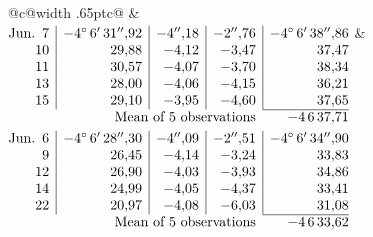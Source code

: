 \noindent\begin{tabular}{@{}c@{\hspace{.4em}\vrule width .65pt\hspace{.4em}}c@{}}
 &
 \\[.18ex]
\(\begin{array}[t]{@{}r|r|r|r|r@{}}
\text{Jun.}\enspace 7 & -4^\circ\,6'\,31''{,}92 & -4''{,}18 & -2''{,}76 & -4^\circ\,6'\,38''{,}86\\
10 & 29{,}88 & -4{,}12 & -3{,}47 & 37{,}47\\
11 & 30{,}57 & -4{,}07 & -3{,}70 & 38{,}34\\
13 & 28{,}00 & -4{,}06 & -4{,}15 & 36{,}21\\
15 & 29{,}10 & -3{,}95 & -4{,}60 & 37{,}65\\
\cline{5-5}
\multicolumn{4}{r}{\text{Mean of 5 observations}} & -4\,6\,37{,}71
\end{array}\)
&
\(\begin{array}[t]{@{}r|r|r|r|r@{}}
\text{Jun.}\enspace 6 & -4^\circ\,6'\,28''{,}30 & -4''{,}09 & -2''{,}51 & -4^\circ\,6'\,34''{,}90\\
9 & 26{,}45 & -4{,}14 & -3{,}24 & 33{,}83\\
12 & 26{,}90 & -4{,}03 & -3{,}93 & 34{,}86\\
14 & 24{,}99 & -4{,}05 & -4{,}37 & 33{,}41\\
22 & 20{,}97 & -4{,}08 & -6{,}03 & 31{,}08\\
\cline{5-5}
\multicolumn{4}{r}{\text{Mean of 5 observations}} & -4\,6\,33{,}62
\end{array}\)
\end{tabular}\par\medskip
{}
